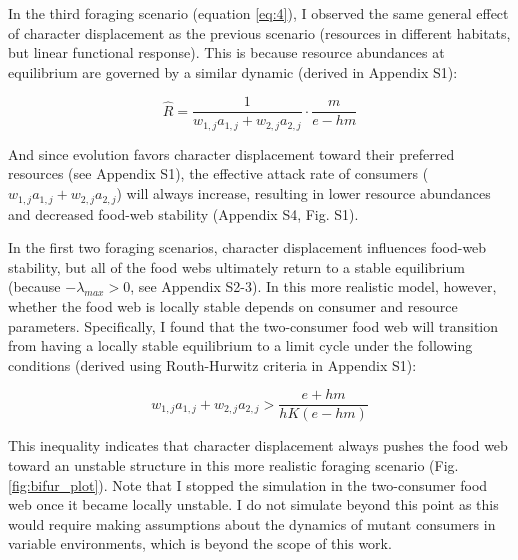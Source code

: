 \documentclass[11pt,]{article}
\begin{document}
In the third foraging scenario (equation \ref{eq:4}), I observed the
same general effect of character displacement as the previous scenario
(resources in different habitats, but linear functional response). This
is because resource abundances at equilibrium are governed by a similar
dynamic (derived in Appendix S1):

\begin{equation} \label{eq:7}
  \hat{R}=\frac{1}{w_{1,j}a_{1,j}+w_{2,j}a_{2,j}}\cdot\frac{m}{e-hm}
\end{equation}

And since evolution favors character displacement toward their preferred
resources (see Appendix S1), the effective attack rate of consumers
(\(w_{1,j}a_{1,j}+w_{2,j}a_{2,j}\)) will always increase, resulting in
lower resource abundances and decreased food-web stability (Appendix S4,
Fig. S1).

In the first two foraging scenarios, character displacement influences
food-web stability, but all of the food webs ultimately return to a
stable equilibrium (because \(-\lambda_{max}>0\), see Appendix S2-3). In
this more realistic model, however, whether the food web is locally
stable depends on consumer and resource parameters. Specifically, I
found that the two-consumer food web will transition from having a
locally stable equilibrium to a limit cycle under the following
conditions (derived using Routh-Hurwitz criteria in Appendix S1):

\begin{equation} \label{eq:8}
  w_{1,j}a_{1,j}+w_{2,j}a_{2,j} > \frac{e+hm}{hK(e-hm)}
\end{equation}

This inequality indicates that character displacement always pushes the
food web toward an unstable structure in this more realistic foraging
scenario (Fig. \ref{fig:bifur_plot}). Note that I stopped the simulation
in the two-consumer food web once it became locally unstable. I do not
simulate beyond this point as this would require making assumptions
about the dynamics of mutant consumers in variable environments, which
is beyond the scope of this work.
\end{document}
